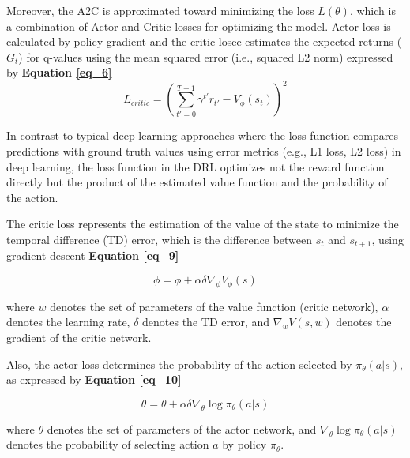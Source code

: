 \documentclass[conference]{IEEEtran}
\begin{document}
Moreover, the A2C is approximated toward minimizing the loss $L(\theta)$, which is a combination of Actor and Critic losses for optimizing the model. Actor loss is calculated by policy gradient and the critic losee estimates the expected returns ($G_t$) for q-values using the mean squared error (i.e., squared L2 norm) expressed by \textbf{Equation \eqref{eq_6}}
\begin{equation} \label{eq_6}
    L_{critic} = (\sum_{t'=0}^{T-1}\gamma^{t'}r_{t'}-V_\phi(s_t))^2
\end{equation}

In contrast to typical deep learning approaches where the loss function compares predictions with ground truth values using error metrics (e.g., L1 loss, L2 loss) in deep learning, the loss function in the DRL optimizes not the reward function directly but the product of the estimated value function and the probability of the action. 

The critic loss represents the estimation of the value of the state to minimize the temporal difference (TD) error, which is the difference between $s_t$ and $s_{t+1}$, using gradient descent \textbf{Equation \eqref{eq_9}}

\begin{equation} \label{eq_9}
    \phi = \phi + \alpha\delta\nabla_{\phi} V_{\phi}(s)
\end{equation}

where $w$ denotes the set of parameters of the value function (critic network), $\alpha$ denotes the learning rate, $\delta$ denotes the TD error, and $\nabla_w V(s,w)$ denotes the gradient of the critic network.

Also, the actor loss determines the probability of the action selected by $\pi_{\theta}(a|s)$, as expressed by \textbf{Equation \eqref{eq_10}}

\begin{equation} \label{eq_10}
    \theta = \theta + \alpha\delta\nabla_{\theta}\log\pi_{\theta}(a|s)
\end{equation}

where $\theta$ denotes the set of parameters of the actor network, and $\nabla_{\theta}\log\pi_{\theta}(a|s)$ denotes the probability of selecting action $a$ by policy $\pi_{\theta}$. 
\end{document}
